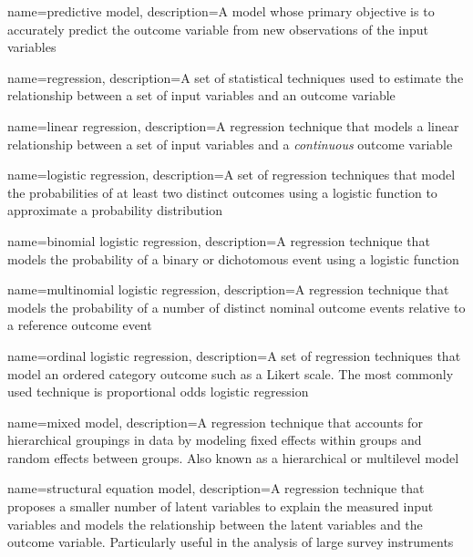 {
    name={predictive model},
    description={A model whose primary objective is to accurately predict the outcome variable from new observations of the input variables}
}

{
    name={regression},
    description={A set of statistical techniques used to estimate the relationship between a set of input variables and an outcome variable}
}

{
    name={linear regression},
    description={A regression technique that models a linear relationship between a set of input variables and a \textit{continuous} outcome variable}
}

{
    name={logistic regression},
    description={A set of regression techniques that model the probabilities of at least two distinct outcomes using a logistic function to approximate a probability distribution}
}

{
    name={binomial logistic regression},
    description={A regression technique that models the probability of a binary or dichotomous event using a logistic function}
}

{
    name={multinomial logistic regression},
    description={A regression technique that models the probability of a number of distinct nominal outcome events relative to a reference outcome event}
}

{
    name={ordinal logistic regression},
    description={A set of regression techniques that model an ordered category outcome such as a Likert scale.  The most commonly used technique is proportional odds logistic regression}
}

{
    name={mixed model},
    description={A regression technique that accounts for hierarchical groupings in data by modeling fixed effects within groups and random effects between groups.  Also known as a hierarchical or multilevel model}
}

{
    name={structural equation model},
    description={A regression technique that proposes a smaller number of latent variables to explain the measured input variables and models the relationship between the latent variables and the outcome variable.  Particularly useful in the analysis of large survey instruments}
}

